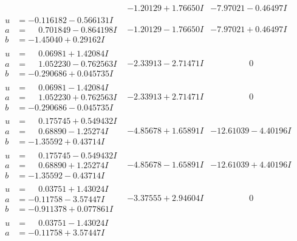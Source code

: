 \documentclass[1p]{elsarticle_modified}
\theoremstyle{definition}
\begin{document}
$$\begin{array}{c|c|c}
 & -1.20129 + 1.76650 I & -7.97021 - 0.46497 I \\ \hline\begin{aligned}
u &= -0.116182 - 0.566131 I \\
a &= \phantom{-}0.701849 - 0.864198 I \\
b &= -1.45040 + 0.29162 I\end{aligned}
 & -1.20129 - 1.76650 I & -7.97021 + 0.46497 I \\ \hline\begin{aligned}
u &= \phantom{-}0.06981 + 1.42084 I \\
a &= \phantom{-}1.052230 - 0.762563 I \\
b &= -0.290686 + 0.045735 I\end{aligned}
 & -2.33913 - 2.71471 I & \phantom{-0.000000 } 0 \\ \hline\begin{aligned}
u &= \phantom{-}0.06981 - 1.42084 I \\
a &= \phantom{-}1.052230 + 0.762563 I \\
b &= -0.290686 - 0.045735 I\end{aligned}
 & -2.33913 + 2.71471 I & \phantom{-0.000000 } 0 \\ \hline\begin{aligned}
u &= \phantom{-}0.175745 + 0.549432 I \\
a &= \phantom{-}0.68890 - 1.25274 I \\
b &= -1.35592 + 0.43714 I\end{aligned}
 & -4.85678 + 1.65891 I & -12.61039 - 4.40196 I \\ \hline\begin{aligned}
u &= \phantom{-}0.175745 - 0.549432 I \\
a &= \phantom{-}0.68890 + 1.25274 I \\
b &= -1.35592 - 0.43714 I\end{aligned}
 & -4.85678 - 1.65891 I & -12.61039 + 4.40196 I \\ \hline\begin{aligned}
u &= \phantom{-}0.03751 + 1.43024 I \\
a &= -0.11758 - 3.57447 I \\
b &= -0.911378 + 0.077861 I\end{aligned}
 & -3.37555 + 2.94604 I & \phantom{-0.000000 } 0 \\ \hline\begin{aligned}
u &= \phantom{-}0.03751 - 1.43024 I \\
a &= -0.11758 + 3.57447 I \\

\end{aligned}
\end{array}$$
\end{document}
